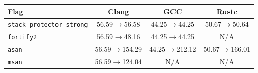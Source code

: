 \begin{tabular*}{\columnwidth}{@{\extracolsep\fill}lccc@{\extracolsep\fill}}
\toprule
\textbf{Flag} & \textbf{Clang} & \textbf{GCC} & \textbf{Rustc} \\
\midrule
\texttt{stack\_protector\_strong} & 56.59$\to$56.58 & 44.25$\to$44.25 & 50.67$\to$50.64 \\
\texttt{fortify2} & 56.59$\to$48.16 & 44.25$\to$44.25 & N/A \\
\texttt{asan} & 56.59$\to$154.29 & 44.25$\to$212.12 & 50.67$\to$166.01 \\
\texttt{msan} & 56.59$\to$124.04 & N/A & N/A \\
\bottomrule
\end{tabular*}
